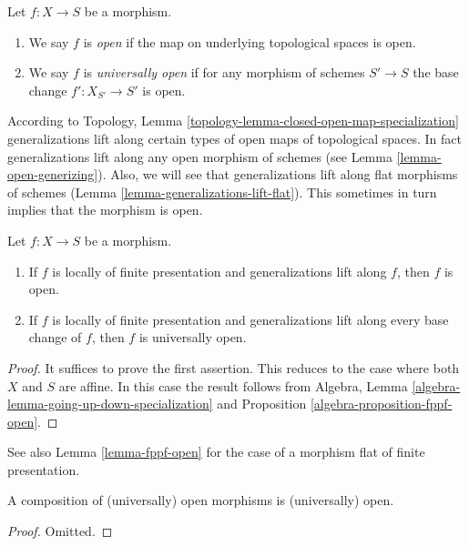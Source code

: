 \begin{definition}
\label{definition-open}
Let $f : X \to S$ be a morphism.
\begin{enumerate}
\item We say $f$ is {\it open} if the map on underlying
topological spaces is open.
\item We say $f$ is {\it universally open} if for any morphism of
schemes $S' \to S$ the base change $f' : X_{S'} \to S'$ is open.
\end{enumerate}
\end{definition}

\noindent
According to
Topology, Lemma \ref{topology-lemma-closed-open-map-specialization}
generalizations lift along certain types of open maps of topological
spaces. In fact generalizations lift along any open morphism of schemes
(see
Lemma \ref{lemma-open-generizing}).
Also, we will see that generalizations lift along flat morphisms
of schemes (Lemma \ref{lemma-generalizations-lift-flat}).
This sometimes in turn implies that the morphism is open.

\begin{lemma}
\label{lemma-locally-finite-presentation-universally-open}
Let $f : X \to S$ be a morphism.
\begin{enumerate}
\item If $f$ is locally of finite presentation and generalizations lift
along $f$, then $f$ is open.
\item If $f$ is locally of finite presentation and generalizations lift
along every base change of $f$, then $f$ is universally open.
\end{enumerate}
\end{lemma}

\begin{proof}
It suffices to prove the first assertion.
This reduces to the case where both $X$ and $S$ are affine.
In this case the result follows from
Algebra, Lemma \ref{algebra-lemma-going-up-down-specialization}
and Proposition \ref{algebra-proposition-fppf-open}.
\end{proof}

\noindent
See also Lemma \ref{lemma-fppf-open} for the case of a morphism
flat of finite presentation.

\begin{lemma}
\label{lemma-composition-open}
A composition of (universally) open morphisms is (universally) open.
\end{lemma}

\begin{proof}
Omitted.
\end{proof}

